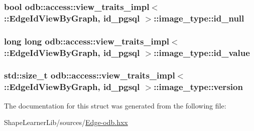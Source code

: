 \subsubsection[{id\+\_\+null}]{\setlength{\rightskip}{0pt plus 5cm}bool odb\+::access\+::view\+\_\+traits\+\_\+impl$<$ \+::{\bf Edge\+Id\+View\+By\+Graph}, id\+\_\+pgsql $>$\+::image\+\_\+type\+::id\+\_\+null}\label{structodb_1_1access_1_1view__traits__impl_3_01_1_1_edge_id_view_by_graph_00_01id__pgsql_01_4_1_1image__type_acff0a215ebf66747fa3c16c2d9047e58}
\hypertarget{structodb_1_1access_1_1view__traits__impl_3_01_1_1_edge_id_view_by_graph_00_01id__pgsql_01_4_1_1image__type_a6fa029dd683797b00c7df2f76f604006}{}
\subsubsection[{id\+\_\+value}]{\setlength{\rightskip}{0pt plus 5cm}long long odb\+::access\+::view\+\_\+traits\+\_\+impl$<$ \+::{\bf Edge\+Id\+View\+By\+Graph}, id\+\_\+pgsql $>$\+::image\+\_\+type\+::id\+\_\+value}\label{structodb_1_1access_1_1view__traits__impl_3_01_1_1_edge_id_view_by_graph_00_01id__pgsql_01_4_1_1image__type_a6fa029dd683797b00c7df2f76f604006}
\hypertarget{structodb_1_1access_1_1view__traits__impl_3_01_1_1_edge_id_view_by_graph_00_01id__pgsql_01_4_1_1image__type_a896f338fa89e8d90fa8f3bc0ee14bc41}{}
\subsubsection[{version}]{\setlength{\rightskip}{0pt plus 5cm}std\+::size\+\_\+t odb\+::access\+::view\+\_\+traits\+\_\+impl$<$ \+::{\bf Edge\+Id\+View\+By\+Graph}, id\+\_\+pgsql $>$\+::image\+\_\+type\+::version}\label{structodb_1_1access_1_1view__traits__impl_3_01_1_1_edge_id_view_by_graph_00_01id__pgsql_01_4_1_1image__type_a896f338fa89e8d90fa8f3bc0ee14bc41}


The documentation for this struct was generated from the following file\+:\begin{DoxyCompactItemize}
\item 
Shape\+Learner\+Lib/sources/\hyperlink{_edge-odb_8hxx}{Edge-\/odb.\+hxx}\end{DoxyCompactItemize}

